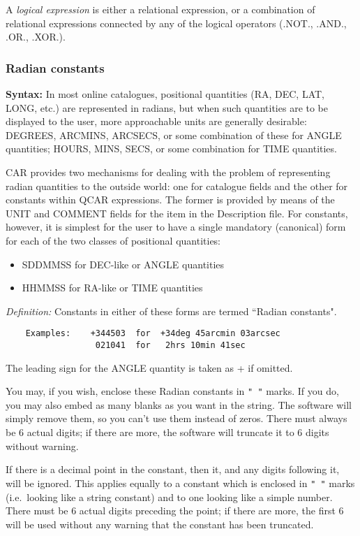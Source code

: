 A {\em logical expression} is either a relational expression, or a combination
of relational expressions connected by any of the logical operators
(.NOT., .AND., .OR., .XOR.).
\subsubsection {Radian constants}
{\bf Syntax:} In most online catalogues, positional quantities (RA, DEC, LAT,
LONG, etc.) are represented in radians, but when such quantities are to be
displayed to the user, more approachable units are generally desirable:
DEGREES, ARCMINS, ARCSECS, or some combination of these for ANGLE quantities;
HOURS, MINS, SECS, or some combination for TIME quantities.

CAR provides two mechanisms for dealing with the problem of representing radian
quantities to the outside world: one for catalogue fields and the other for
constants within QCAR expressions.
The former is provided by means of the UNIT and COMMENT fields for the item in
the Description file.
For constants,  however, it is simplest for the user to have a single mandatory
(canonical) form for each of the two classes of positional quantities:
\begin{itemize}
\item SDDMMSS  for DEC-like or ANGLE quantities
\item HHMMSS   for RA-like or TIME quantities
\end{itemize}
{\em Definition:} Constants in either of these forms are termed ``Radian
constants".
\begin{verbatim}
    Examples:    +344503  for  +34deg 45arcmin 03arcsec
                  021041  for   2hrs 10min 41sec
\end{verbatim}
The leading sign for the ANGLE quantity is taken as + if omitted.

You may, if you wish, enclose these Radian constants in {\tt "  "} marks.
If you do, you may also embed as many blanks as you want in the string.
The software will simply remove them, so you can't use them instead of zeros.
There must always be 6 actual digits; if there are more, the software will
truncate it to 6 digits without warning.

If there is a decimal point in the constant, then it, and any digits following
it, will be ignored.
This applies equally to a constant which is enclosed in {\tt " "} marks
(i.e.\ looking like a string constant) and to one looking like a simple number.
There must be 6 actual digits preceding the point; if there are more, the first
6 will be used without any warning that the constant has been truncated.

